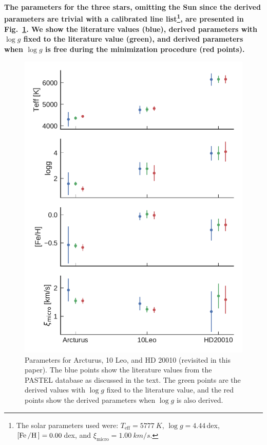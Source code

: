 {\bf The parameters for the three stars, omitting the Sun since the derived
parameters are trivial with a calibrated line list\footnote{The solar parameters
used were: $T_\mathrm{eff}=\SI{5777}{K}$, $\log g=4.44\,$dex,
$[\ion{Fe}/\ion{H}]=0.00\,$dex, and $\xi_\mathrm{micro}=\SI{1.00}{km/s}$.}, are
presented in Fig.~\ref{fig:parameters}. We show the literature values (blue),
derived parameters with $\log g$ fixed to the literature value (green), and
derived parameters when $\log g$ is free during the minimization procedure (red
points).}

\begin{figure}[htpb!]
    \centering
    \includegraphics[width=1.0\linewidth]{figures/parameters.pdf}
    \caption{Parameters for Arcturus, 10 Leo, and HD 20010 (revisited in this
             paper). The blue points show the literature values from the PASTEL
             database as discussed in the text. The green points are the
             derived values with $\log g$ fixed to the literature value, and the
             red points show the derived parameters when $\log g$ is also
             derived.}
    \label{fig:parameters}
\end{figure}



